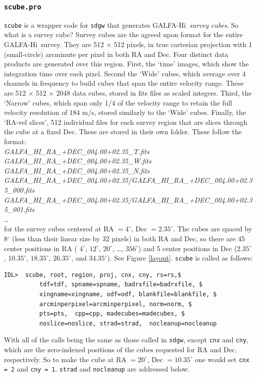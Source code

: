 \documentclass[11pt]{article}
\newcommand{\hi}{H{\sc i}~}
\begin{document}
{\subsubsection{\texttt{scube.pro}}

\texttt{scube} is a wrapper code for \texttt{sdgw} that generates GALFA-\hi \emph{survey cubes}. So what is a survey cube? Survey cubes are the agreed upon format for the entire GALFA-\hi survey. They are 512 $\times$ 512 pixels, in true cartesian projection with 1 (small-circle) arcminute per pixel in both RA and Dec. Four distinct data products are generated over this region. First, the `time' images, which show the integration time over each pixel. Second the `Wide' cubes, which average over 4 channels in frequency to build cubes that span the entire velocity range. These are 512 $\times$ 512 $\times$ 2048 data cubes, stored in fits files as scaled integers. Third, the `Narrow' cubes, which span only 1/4 of the velocity range to retain the full velocity resolution of 184 m/s, stored similarly to the `Wide' cubes. Finally, the `RA-vel slices', 512 individual files for each survey region that are slices through the cube at a fixed Dec. These are stored in their own folder. These follow the format:\\

{\it GALFA\_HI\_RA\_+DEC\_004.00+02.35\_T.fits}\\
{\it GALFA\_HI\_RA\_+DEC\_004.00+02.35\_W.fits}\\
{\it GALFA\_HI\_RA\_+DEC\_004.00+02.35\_N.fits}\\
{\it GALFA\_HI\_RA\_+DEC\_004.00+02.35/GALFA\_HI\_RA\_+DEC\_004.00+02.35\_000.fits}\\
{\it GALFA\_HI\_RA\_+DEC\_004.00+02.35/GALFA\_HI\_RA\_+DEC\_004.00+02.35\_001.fits}\\
{\it \ldots}\\

for the survey cubes centered at RA $= 4^\circ$, Dec $= 2.35^\circ$. The cubes are spaced by 8$^\circ$ (less than their linear size by 32 pixels) in both RA and Dec, so there are 45 center positions in RA ( $4^\circ$,  $12^\circ$,  $20^\circ$, \ldots,  $356^\circ$) and 5 center positions in Dec  ($2.35^\circ$, $10.35^\circ$, $18.35^\circ$, $26.35^\circ$, and $34.35^\circ$). See Figure \ref{layout}. \texttt{scube} is called as follows:

\begin{verbatim}
IDL>  scube, root, region, proj, cnx, cny, rs=rs,$
          tdf=tdf, spname=spname, badrxfile=badrxfile, $
          xingname=xingname, odf=odf, blankfile=blankfile, $ 
          arcminperpixel=arcminperpixel, norm=norm, $
          pts=pts,  cpp=cpp, madecubes=madecubes, $
          noslice=noslice, strad=strad,  nocleanup=nocleanup
\end{verbatim}
With all of the calls being the same as those called in \texttt{sdgw}, except \texttt{cnx} and \texttt{cny}, which are the zero-indexed positions of the cubes requested for RA and Dec, respectively. So to make the cube at RA $= 20^\circ$, Dec $= 10.35^\circ$ one would set \texttt{cnx = 2} and \texttt{cny = 1}. \texttt{strad} and \texttt{nocleanup} are addressed below.

}
\end{document}
